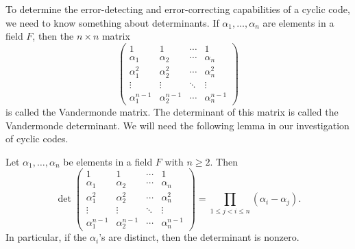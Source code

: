 To determine the error-detecting and error-correcting capabilities of a cyclic code, we need to know something about determinants.  If $\alpha_1, \ldots, \alpha_n$ are elements in a field $F$, then the $n 
\times n$ matrix  
\[
\begin{pmatrix}
1          & 1          & \cdots & 1 \\
\alpha_1   & \alpha_2   & \cdots & \alpha_n \\
\alpha_1^2 & \alpha_2^2 & \cdots & \alpha_n^2 \\
\vdots     & \vdots     & \ddots & \vdots \\
\alpha_1^{n-1} & \alpha_2^{n-1} & \cdots & \alpha_n^{n-1} 
\end{pmatrix}
\]
is called the {\bfi Vandermonde matrix}.  The
determinant of this matrix is called the {\bfi Vandermonde determinant}.  We will need the following lemma in our investigation of cyclic codes.

\begin{lemma}\label{finite:V_det_lemma}
Let $\alpha_1, \ldots, \alpha_n$ be elements in a field $F$ with $n \geq 2$.  Then
\[
\det
\begin{pmatrix}
1              & 1              & \cdots & 1 \\
\alpha_1       & \alpha_2       & \cdots & \alpha_n \\
\alpha_1^2     & \alpha_2^2     & \cdots & \alpha_n^2 \\
\vdots         & \vdots         & \ddots & \vdots \\
\alpha_1^{n-1} & \alpha_2^{n-1} & \cdots & \alpha_n^{n-1} 
\end{pmatrix}
= 
\prod_{1 \leq j < i \leq n} (\alpha_i - \alpha_j).
\]
In particular, if the $\alpha_i$'s are distinct, then the determinant is nonzero.
\end{lemma}


